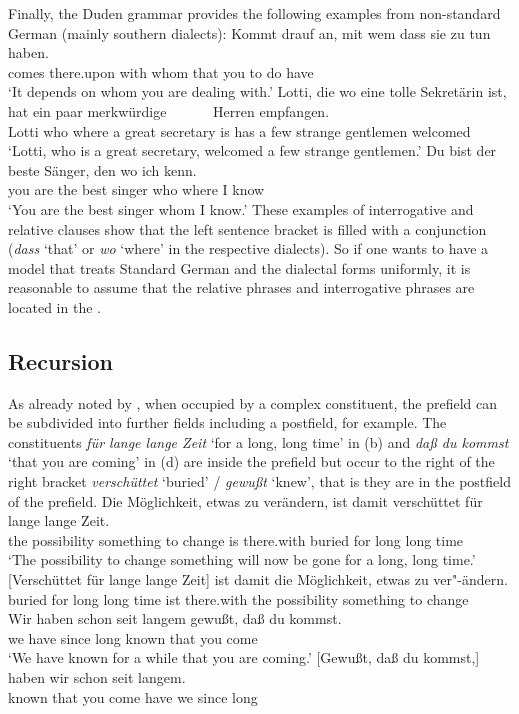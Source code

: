 Finally, the Duden grammar \citep[§1347]{Duden2005-Authors} provides the following examples from non-standard German
(mainly southern dialects):
\ea 
\gll Kommt drauf an, mit wem dass sie zu tun haben.\\
     comes there.upon \partic{} with whom that you to do have\\
\glt `It depends on whom you are dealing with.'
\z
\eal
\ex 
\gll Lotti, die wo eine tolle Sekretärin ist, hat ein paar merkwürdige~~~~~~ Herren empfangen.\\
     Lotti  who where a great secretary is has a few strange gentlemen welcomed\\
\glt `Lotti, who is a great secretary, welcomed a few strange gentlemen.'
\ex 
\gll Du bist der beste Sänger, den wo ich kenn.\\
     you are the best singer   who where I know\\
\glt `You are the best singer whom I know.'
\zl
These examples of interrogative and relative clauses show that the left sentence bracket is filled
with a conjunction (\emph{dass} `that' or \emph{wo} `where' in the respective dialects). So if one wants to have a model that treats Standard German and the
dialectal forms uniformly, it is reasonable to assume that the relative phrases and interrogative phrases
are located in the \vf. 

\subsection{Recursion}
\label{sec-topo-rekursion}

As already noted by \citet[]{Reis80a}, when occupied by a complex constituent, the prefield can be subdivided into 
further fields including a postfield, for example. The constituents \emph{für lange lange Zeit} `for a long, long
time' in (b) and  \emph{daß du kommst} `that you are coming' in (d) are inside the prefield but occur
to the right of the right bracket \emph{verschüttet} `buried' / \emph{gewußt} `knew', that is they are in the postfield
of the prefield.
\eal
\label{Beispiel-topologisch-komplexes-Vorfeld}
\ex
\gll Die Möglichkeit, etwas zu verändern, ist damit verschüttet für lange lange Zeit.\\
	 the possibility something to change is there.with buried for long long time\\
\glt `The possibility to change something will now be gone for a long, long time.'	  
\ex 
\gll {}[Verschüttet für lange lange Zeit] ist damit die Möglichkeit,      etwas zu ver"-ändern.\\
      \spacebr{}buried for long long time ist there.with the possibility  something to change\\
\ex 
\gll Wir haben schon seit langem gewußt, daß du kommst.\\
     we have \particle{} since long known that you come\\
\glt `We have known for a while that you are coming.'
\ex 
\gll {}[Gewußt, daß du kommst,] haben wir schon seit langem.\\
	 \spacebr{}known that you come have we \particle{} since long\\
\zl


